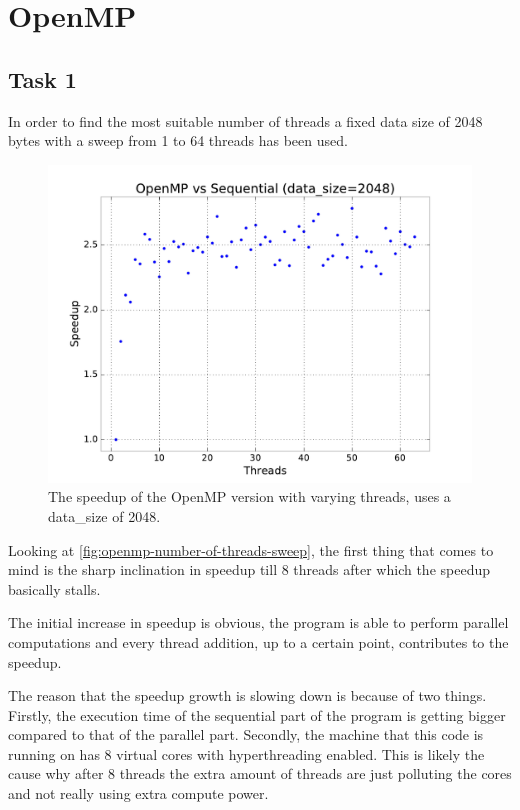 \documentclass[final]{report}
\begin{document}
\chapter{OpenMP}
\section{Task 1}
In order to find the most suitable number of threads a fixed data size of 2048 bytes with a sweep from 1 to 64 threads has been used.
\begin{figure}[H]
\centering
    \includegraphics[width=\linewidth]{resources/openmp-number-of-threads-sweep.pdf}
    \caption{The speedup of the OpenMP version with varying threads, uses a data\_size of 2048.}
    \label{fig:openmp-number-of-threads-sweep}
\end{figure}
Looking at \autoref{fig:openmp-number-of-threads-sweep}, the first thing that comes to mind is the sharp inclination in speedup till 8 threads after which the speedup basically stalls.

The initial increase in speedup is obvious, the program is able to perform parallel computations and every thread addition, up to a certain point, contributes to the speedup.

The reason that the speedup growth is slowing down is because of two things.
Firstly, the execution time of the sequential part of the program is getting bigger compared to that of the parallel part.
Secondly, the machine that this code is running on has 8 virtual cores with hyperthreading enabled.
This is likely the cause why after 8 threads the extra amount of threads are just polluting the cores and not really using extra compute power.
\end{document}
